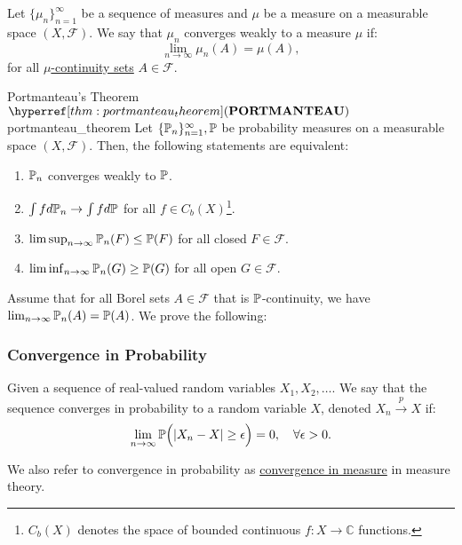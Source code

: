 \begin{definition}
    Let $\{\mu_n\}_{n=1}^\infty$ be a sequence of measures and $\mu$ be a measure on a measurable space $(X, \mathcal{F})$. We say that $\mu_n$ converges weakly to a measure $\mu$ if:
    \begin{equation}
        \lim_{n\to\infty}\mu_n(A) = \mu(A),
    \end{equation} 
    \noindent for all \underline{$\mu$-continuity sets} $A\in\mathcal{F}$.
\end{definition} 


\begin{theorem}{Portmanteau's Theorem $\PORT$}{portmanteau_theorem}
    Let $\{\mathbb{P}_n\}_{n=1}^\infty, \mathbb{P}$ be probability measures on a measurable space $(X, \mathcal{F})$. Then, the following statements are equivalent:
    \begin{enumerate}
        \item $\mathbb{P}_n$ converges weakly to $\mathbb{P}$.
        \item $\int fd\mathbb{P}_n \to \int fd\mathbb{P}$ for all $f\in C_b(X)$\footnote{$C_b(X)$ denotes the space of bounded continuous $f:X\to\mathbb{C}$ functions.}.   
        \item $\limsup_{n\to\infty}\mathbb{P}_n(F) \le \mathbb{P}(F)$ for all closed $F\in\mathcal{F}$.
        \item $\liminf_{n\to\infty}\mathbb{P}_n(G) \ge \mathbb{P}(G)$ for all open $G\in\mathcal{F}$.  
    \end{enumerate}  
\end{theorem} 

\begin{proof*}
    Assume that for all Borel sets $A\in\mathcal{F}$ that is $\mathbb{P}$-continuity, we have $\lim_{n\to\infty} \mathbb{P}_n(A) = \mathbb{P}(A)$. We prove the following: 
\end{proof*} 

\subsubsection{Convergence in Probability}
\begin{definition}
    Given a sequence of real-valued random variables $X_1, X_2, \dots$. We say that the sequence converges in probability to a random variable $X$, denoted $X_n\xrightarrow{p}X$ if:
    \begin{equation}
        \lim_{n\to\infty} \mathbb{P}\Big( |X_n - X| \ge \epsilon \Big) = 0, \quad \forall \epsilon > 0.
    \end{equation}

    \noindent We also refer to convergence in probability as \underline{convergence in measure} in measure theory.
\end{definition}

